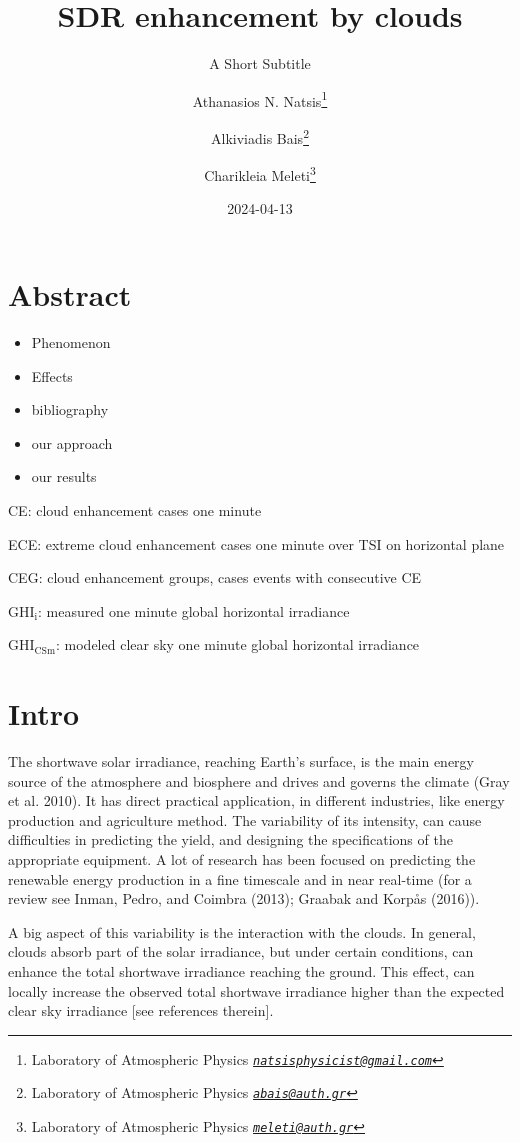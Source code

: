 \documentclass[
]{article}
\title{SDR enhancement by clouds}
\subtitle{A Short Subtitle}
\author{Athanasios N. Natsis\footnote{Laboratory of Atmospheric Physics \emph{\href{mailto:natsisphysicist@gmail.com}{\nolinkurl{natsisphysicist@gmail.com}}}} \and Alkiviadis Bais\footnote{Laboratory of Atmospheric Physics \emph{\href{mailto:abais@auth.gr}{\nolinkurl{abais@auth.gr}}}} \and Charikleia Meleti\footnote{Laboratory of Atmospheric Physics \emph{\href{mailto:meleti@auth.gr}{\nolinkurl{meleti@auth.gr}}}}}
\date{2024-04-13}
\providecommand{\tightlist}{%
  \setlength{\itemsep}{0pt}\setlength{\parskip}{0pt}}
\begin{document}
\maketitle

{
\setcounter{tocdepth}{4}
\tableofcontents
}
\hypertarget{abstract}{%
\section*{Abstract}\label{abstract}}

\begin{itemize}
\tightlist
\item
  Phenomenon
\item
  Effects
\item
  bibliography
\item
  our approach
\item
  our results
\end{itemize}

CE: cloud enhancement cases one minute

ECE: extreme cloud enhancement cases one minute over TSI on horizontal plane

CEG: cloud enhancement groups, cases events with consecutive CE

\(\text{GHI}_\text{i}\): measured one minute global horizontal irradiance

\(\text{GHI}_\text{CSm}\): modeled clear sky one minute global horizontal irradiance

\hypertarget{intro}{%
\section{Intro}\label{intro}}

The shortwave solar irradiance, reaching Earth's surface, is the main energy source
of the atmosphere and biosphere and drives and governs the climate (Gray et al. 2010). It
has direct practical application, in different industries, like energy production and
agriculture method. The variability of its intensity, can cause difficulties in
predicting the yield, and designing the specifications of the appropriate equipment.
A lot of research has been focused on predicting the renewable energy production in a
fine timescale and in near real-time (for a review see Inman, Pedro, and Coimbra (2013); Graabak and Korpås (2016)).

A big aspect of this variability is the interaction with the clouds. In general,
clouds absorb part of the solar irradiance, but under certain conditions, can enhance
the total shortwave irradiance reaching the ground. This effect, can locally increase
the observed total shortwave irradiance higher than the expected clear sky irradiance
{[}see references therein{]}.
\end{document}
